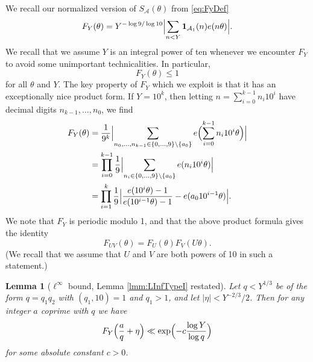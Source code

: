 \documentclass[10pt]{amsart}
\theoremstyle{plain}
\newtheorem{lmm}[thrm]{Lemma}
\numberwithin{sblmm}{thrm}
\numberwithin{equation}{section}
\begin{document}
We recall our normalized version of $S_{\mathcal{A}}(\theta)$ from \eqref{eq:FyDef}
\[
F_{Y}(\theta)=Y^{-\log{9}/\log{10}}\Bigl|\sum_{n<Y}\mathbf{1}_{\mathcal{A}_1}(n)e(n\theta)\Bigr|.
\]
We recall that we assume $Y$ is an integral power of ten whenever we encounter $F_Y$ to avoid some unimportant technicalities. In particular,
%
\begin{equation}
F_Y(\theta)\le 1
\label{eq:FyBound}
\end{equation}
%
for all $\theta$ and $Y$. The key property of $F_Y$ which we exploit is that it has an exceptionally nice product form. If $Y=10^k$, then letting $n=\sum_{i=0}^{k-1}n_i 10^i$ have decimal digits $n_{k-1},\dots, n_0$, we find
%
\begin{align}
F_Y(\theta)&=\frac{1}{9^k}\Bigl|\sum_{n_0,\dots,n_{k-1}\in\{0,\dots,9\}\backslash \{a_0\}}e\Bigl(\sum_{i=0}^{k-1}n_i10^i\theta\Bigr)\Bigr|\nonumber\\
&=\prod_{i=0}^{k-1}\frac{1}{9}\Bigl|\sum_{n_i\in\{0,\dots,9\}\backslash \{a_0\}}e(n_i 10^i \theta)\Bigr|\nonumber\\
&=\prod_{i=1}^k\frac{1}{9}\Bigl|\frac{e(10^{i}\theta)-1}{e(10^{i-1}\theta)-1}-e(a_010^{i-1}\theta)\Bigr|.
\label{eq:ProductFormula}
\end{align}
%
We note that $F_Y$ is periodic modulo 1, and that the above product formula gives the identity
%
\begin{equation}
F_{UV}(\theta)=F_U(\theta)F_V(U\theta).
\label{eq:FFactorization}
\end{equation}
%
(We recall that we assume that $U$ and $V$ are both powers of 10 in such a statement.)
%
%
%
%
\begin{lmm}[$\ell^\infty$ bound, Lemma \ref{lmm:LInfTypeI} restated]\label{lmm:LInfBound}
%
Let $q<Y^{1/3}$ be of the form $q=q_1q_2$ with $(q_1,10)=1$ and $q_1>1$, and let $|\eta|<Y^{-2/3}/2$. Then for any integer $a$ coprime with $q$ we have 
\[ 
F_{Y}\Bigl(\frac{a}{q}+\eta\Bigr)\ll \exp\Bigl(-c\frac{\log{Y}}{\log{q}}\Bigr)
\]
for some absolute constant $c>0$.
%
\end{lmm}
%
%
%
%
\end{document}
